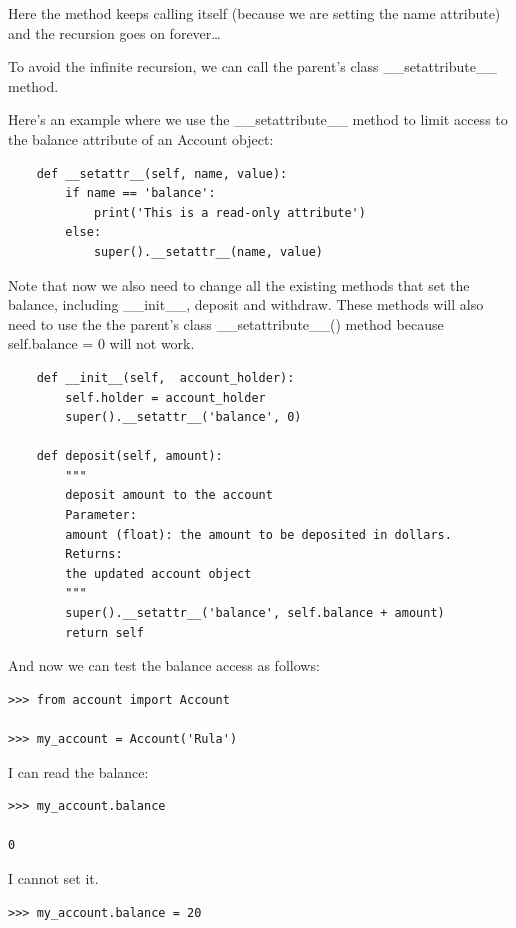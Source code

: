 \documentclass{article}
\begin{document}
Here the method keeps calling itself (because we are setting the name attribute) and the recursion goes on forever…

To avoid the infinite recursion, we can call the parent’s class {\_}{\_}setattribute{\_}{\_} method.

Here's an example where we use the {\_}{\_}setattribute{\_}{\_} method to limit access to the balance attribute of an Account object:

\begin{lstlisting}
    def __setattr__(self, name, value):
        if name == 'balance':
            print('This is a read-only attribute')
        else:
            super().__setattr__(name, value)
\end{lstlisting}
            
Note that now we also need to change all the existing methods that set the balance, including {\_}{\_}init{\_}{\_}, deposit and withdraw.  These methods will also need to use the the parent’s class {\_}{\_}setattribute{\_}{\_}() method because self.balance = 0 will not work.

\begin{lstlisting}
    def __init__(self,  account_holder):
        self.holder = account_holder
        super().__setattr__('balance', 0)
 
    def deposit(self, amount):
        """
        deposit amount to the account
        Parameter:
        amount (float): the amount to be deposited in dollars.
        Returns:
        the updated account object
        """
        super().__setattr__('balance', self.balance + amount)
        return self
\end{lstlisting}
        
And now we can test the balance access as follows:

\begin{lstlisting}
>>> from account import Account

>>> my_account = Account('Rula')
\end{lstlisting}

I can read the balance:

\begin{lstlisting}
>>> my_account.balance

0
\end{lstlisting}

I cannot set it.

\begin{lstlisting}
>>> my_account.balance = 20
\end{lstlisting}
\end{document}
